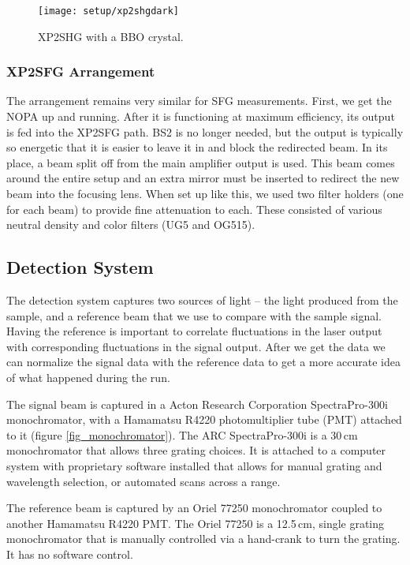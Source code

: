 \begin{figure}[h]
\centering
\texttt{[image: setup/xp2shgdark]}
\caption{XP2SHG with a BBO crystal.\label{xp2shgdark}}
\end{figure}

\subsubsection{XP2SFG Arrangement}
The arrangement remains very similar for SFG measurements. First, we get the NOPA up and running. After it is functioning at maximum efficiency, its output is fed into the XP2SFG path. BS2 is no longer needed, but the output is typically so energetic that it is easier to leave it in and block the redirected beam. In its place, a beam split off from the main amplifier output is used. This beam comes around the entire setup and an extra mirror must be inserted to redirect the new beam into the focusing lens. When set up like this, we used two filter holders (one for each beam) to provide fine attenuation to each. These consisted of various neutral density and color filters (UG5 and OG515).

\subsection{Detection System}\label{chap_setup_det}
The detection system captures two sources of light -- the light produced from the sample, and a reference beam that we use to compare with the sample signal. Having the reference is important to correlate fluctuations in the laser output with corresponding fluctuations in the signal output. After we get the data we can normalize the signal data with the reference data to get a more accurate idea of what happened during the run.

The signal beam is captured in a Acton Research Corporation SpectraPro-300i monochromator, with a Hamamatsu R4220 photomultiplier tube (PMT) attached to it (figure \ref{fig_monochromator}). The ARC SpectraPro-300i is a 30\,cm monochromator that allows three grating choices. It is attached to a computer system with proprietary software installed that allows for manual grating and wavelength selection, or automated scans across a range.

The reference beam is captured by an Oriel 77250 monochromator coupled to another Hamamatsu R4220 PMT. The Oriel 77250 is a 12.5\,cm, single grating monochromator that is manually controlled via a hand-crank to turn the grating. It has no software control.


